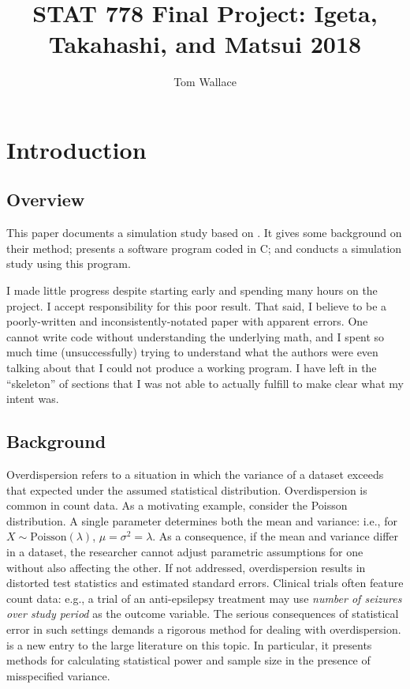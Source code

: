 \documentclass{article}
\author{Tom Wallace}
\title{STAT 778 Final Project: Igeta, Takahashi, and Matsui 2018}
\begin{document}
\maketitle

\section{Introduction}

\subsection{Overview}

This paper documents a simulation study based on \cite{igeta2018}. It
gives some background on their method; presents a software program coded in C; 
and conducts a simulation study using this program. 

I made little progress despite starting early and spending many hours on the project. 
I accept responsibility for this poor result.
That said, I believe \cite{igeta2018} to be a poorly-written and
inconsistently-notated paper with apparent errors.
One cannot write code without understanding the underlying math, 
and I spent so much time (unsuccessfully) trying to understand what
the authors were even talking about that I could not produce a working
program. I have left in the ``skeleton'' of sections that I was not able to
actually fulfill to make clear what my intent was.

\subsection{Background}

Overdispersion refers to a situation in which the variance of a dataset exceeds
that expected under the assumed statistical distribution. 
Overdispersion is common in count data. As a motivating example, consider the
Poisson distribution. A single parameter determines both the 
mean and variance: i.e., for $X \sim \mathrm{Poisson}(\lambda)$, $\mu =
\sigma^2 = \lambda$. As a consequence, if the mean and variance
differ in a dataset, the researcher cannot adjust parametric assumptions for 
one without also affecting the other. If not addressed, 
overdispersion results in distorted test statistics and estimated
standard errors. Clinical trials often feature count data: e.g., a trial of an
anti-epsilepsy treatment may use \textit{number of seizures over study period} as the outcome
variable. The serious consequences of statistical error in such settings demands
a rigorous method for dealing with overdispersion. \cite{igeta2018} is a new
entry to the large literature on this topic. In particular, it presents methods
for calculating statistical power and sample size in the presence of
misspecified variance.
\end{document}
